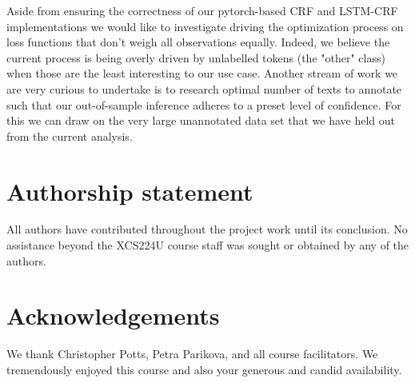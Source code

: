 \documentclass[11pt]{article}
\begin{document}
Aside from ensuring the correctness of our pytorch-based CRF and LSTM-CRF implementations we would like to investigate driving the optimization process on loss functions that don't weigh all observations equally. Indeed, we believe the current process is being overly driven by unlabelled tokens (the "other" class) when those are the least interesting to our use case. Another stream of work we are very curious to undertake is to research optimal number of texts to annotate such that our out-of-sample inference adheres to a preset level of confidence. For this we can draw on the very large unannotated data set that we have held out from the current analysis.

\section*{Authorship statement}
All authors have contributed throughout the project work until its conclusion. No assistance beyond the XCS224U course staff was sought or obtained by any of the authors.

\section*{Acknowledgements}
We thank Christopher Potts, Petra Parikova, and all course facilitators. We
tremendously enjoyed this course and also your
generous and candid availability. 



\end{document}
